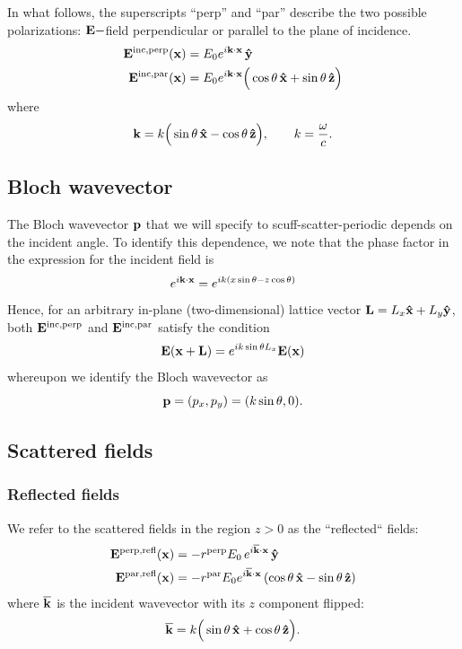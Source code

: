 \documentclass[letterpaper]{article}
\begin{document}
In what follows, the superscripts ``perp'' and ``par'' describe the 
two possible polarizations: $\mathbf{E}-$field perpendicular or parallel to 
the plane of incidence.
\begin{align*}
 \mathbf{E}^{\hbox{\scriptsize{inc,perp}}}(\mathbf{x}) 
  &= E_0 e^{i\mathbf{k} \cdot \mathbf{x}}\, \mathbf{\hat y} 
\\
 \mathbf{E}^{\hbox{\scriptsize{inc,par}}}(\mathbf{x}) 
  &= E_0 e^{i\mathbf{k} \cdot \mathbf{x}} 
     \Big(\cos\theta\,\mathbf{\hat x} + \sin\theta\,\mathbf{\hat z}\Big)
\end{align*}
where 
$$ \mathbf{k}=k\Big(\sin\theta\,\mathbf{\hat x} - \cos\theta\,\mathbf{\hat z}\Big), 
   \qquad 
   k=\frac{\omega}{c}.
$$

\subsection*{Bloch wavevector}

The Bloch wavevector $\mathbf{p}$ that we will specify to 
{\sc scuff-scatter-periodic} depends on the incident 
angle. To identify this dependence, we note that the
phase factor in the expression for the incident field 
is 
$$ e^{i\mathbf{k} \cdot \mathbf{x}} = e^{ik (x\sin\theta - z\cos\theta)}$$
Hence, for an arbitrary in-plane (two-dimensional) lattice 
vector $\mathbf{L}=L_x\mathbf{\hat x}+L_y\mathbf{\hat y}$, both 
$\mathbf{E}^{\hbox{\scriptsize{inc,perp}}}$ and $\mathbf{E}^{\hbox{\scriptsize{inc,par}}}$ satisfy the condition
$$ 
 \mathbf{E}(\mathbf{x}+\mathbf{L}) = e^{ik\sin\theta L_x} \mathbf{E}(\mathbf{x})
$$ 
whereupon we identify the Bloch wavevector as 
$$ \mathbf{p} = (p_x, p_y) = (k\sin\theta, 0).$$

\subsection*{Scattered fields}

\subsubsection*{Reflected fields}

We refer to the scattered fields in the region $z>0$ 
as the ``reflected`` fields:
\begin{subequations}
\begin{align}
 \mathbf{E}^{\hbox{\scriptsize{perp,refl}}}(\mathbf{x})
  &= -r^{\hbox{\scriptsize{perp}}} E_0 \, e^{i\overline{\mathbf{k}}\cdot \mathbf{x}} \, \mathbf{\hat y} 
\\
 \mathbf{E}^{\hbox{\scriptsize{par,refl}}}(\mathbf{x}) 
  &= -r^{\hbox{\scriptsize{par}}} E_0 e^{i\overline{\mathbf{k}}\cdot \mathbf{x}} 
     \left(\cos\theta\,\mathbf{\hat x} - \sin\theta\,\mathbf{\hat z}\right)
\end{align}
\label{Erefl}
\end{subequations}
where $\overline{\mathbf{k}}$ is the incident wavevector with its
$z$ component flipped:
$$ \overline{\mathbf{k}}= k\Big(\sin\theta\,\mathbf{\hat x} + \cos\theta\,\mathbf{\hat z}\Big).$$
\end{document}
